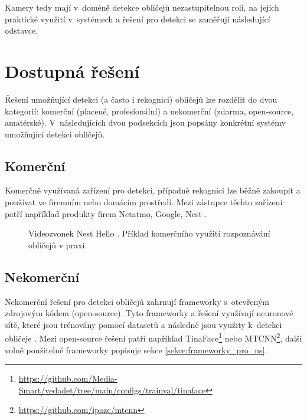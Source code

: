 Kamery tedy mají v~doméně detekce obličejů nezastupitelnou roli, na 
jejich praktické využití v~systémech a řešení pro detekci se zaměřují následující odstavce.

\section{Dostupná řešení}
Řešení umožňující detekci (a často i rekognici) obličejů lze rozdělit do dvou kategorií: 
komerční (placené, profesionální) a nekomerční (zdarma, open-source, amatérské).
V~následujících dvou podsekcích jsou popsány konkrétní systémy umožňující
detekci obličejů.

\subsection*{Komerční}
Komerčně využívaná zařízení pro detekci, případně rekognici lze běžně zakoupit 
a používat ve firemním nebo domácím prostředí. Mezi zástupce těchto zařízení
patří například produkty firem Netatmo, Google, Nest \cite{securityCamsWeb2}.

\begin{figure}[H]
  \begin{center}
  \label{nest}
  \caption{Videozvonek Nest Hello \cite{securityCamsWeb2}. Příklad komerčního využití rozpoznávání obličejů v praxi.}
  \end{center}
\end{figure}

\subsection*{Nekomerční}
Nekomerční řešení pro detekci obličejů zahrnují frameworky s~otevřeným zdrojovým
kódem (open-source). Tyto frameworky a řešení využívají neuronové sítě, které jsou trénovány
pomocí datasetů a následně jsou využity k~detekci obličeje 
\cite{faceRecognitionFrameworks}.
Mezi open-source řešení patří například TinaFace\footnote{\url{https://github.com/Media-Smart/vedadet/tree/main/configs/trainval/tinaface}} nebo MTCNN\footnote{\url{https://github.com/ipazc/mtcnn}}, další volně použitelné frameworky popisuje sekce \ref{sekce:frameworky_pro_ns}.


